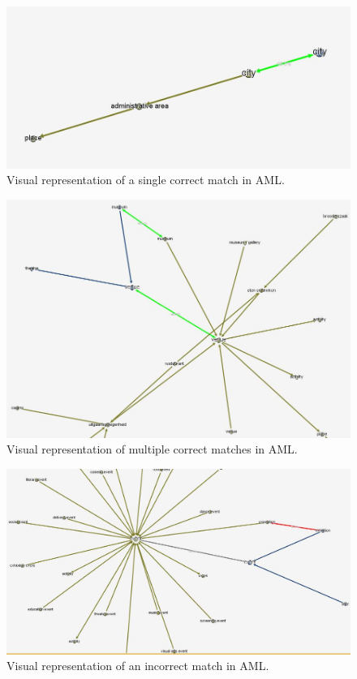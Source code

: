 \documentclass[runningheads,a4paper]{../../StyleFiles/llncs}
\begin{document}
\begin{figure}[h]\centering
	\includegraphics[width=.75\textwidth]{img/match_city.png}
	\caption{Visual representation of a single correct match in AML.}
	\label{fig:single_match}
\end{figure}
\begin{figure}[h] \centering
	\includegraphics[width=.75\textwidth]{img/match_combo.png}
	\caption{Visual representation of multiple correct matches in AML.}
	\label{fig:multiple_match}
\end{figure}
\begin{figure}[h] \centering
	\includegraphics[width=.75\textwidth]{img/conflict_exhibition_exposition.png}
	\caption{Visual representation of an incorrect match in AML.}
	\label{fig:incorrect_match}
\end{figure}
\end{document}
